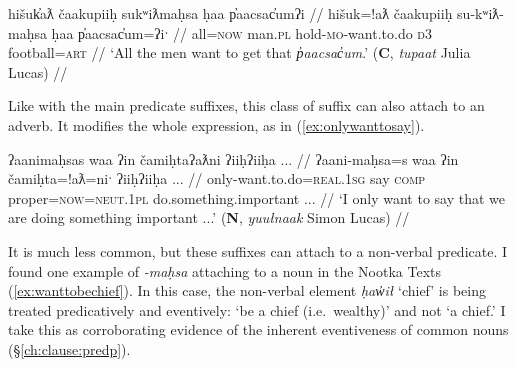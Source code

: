 \ex \label{ex:wanttograb}
\begingl
\glpreamble hišuk̓aƛ čaakupiiḥ sukʷiƛmaḥsa ḥaa p̓aacsac̓umʔi //
\gla hišuk=!aƛ čaakupiiḥ su-kʷiƛ-maḥsa ḥaa p̓aacsac̓um=ʔiˑ //
\glb all=\textsc{now} man.\textsc{pl} hold-\textsc{mo}-want.to.do \textsc{d3} football\footnotemark=\textsc{art} //
\glft `All the men want to get that \textit{p̓aacsac̓um}.' (\textbf{C}, \textit{tupaat} Julia Lucas) //
\endgl
\xe



Like with the main predicate suffixes, this class of suffix can also attach to an adverb. It modifies the whole expression, as in (\ref{ex:onlywanttosay}).

\ex \label{ex:onlywanttosay}
\begingl
\glpreamble ʔaanimaḥsas waa ʔin čamiḥtaʔaƛni ʔiiḥʔiiḥa ... //
\gla ʔaani-maḥsa=s waa ʔin čamiḥta=!aƛ=niˑ ʔiiḥʔiiḥa ... //
\glb only-want.to.do=\textsc{real.1sg} say \textsc{comp} proper=\textsc{now}=\textsc{neut.1pl} do.something.important ... //
\glft `I only want to say that we are doing something important ...' (\textbf{N}, \textit{yuułnaak} Simon Lucas) //
\endgl
\xe


It is much less common, but these suffixes can attach to a non-verbal predicate. I found one example of \textit{-maḥsa} attaching to a noun in the Nootka Texts (\ref{ex:wanttobechief}). In this case, the non-verbal element \textit{ḥaw̓ił} `chief' is being treated predicatively and eventively: `be a chief (i.e.\ wealthy)' and not `a chief.' I take this as corroborating evidence of the inherent eventiveness of common nouns (\S\ref{ch:clause:predp}).

